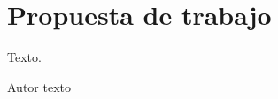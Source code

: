 \chapter{Propuesta de trabajo}
\label{cha:Propuesta de trabajo}

\begin{FraseCelebre}
  \begin{Frase}
    Texto.
  \end{Frase}
  \begin{Fuente}
    Autor texto
  \end{Fuente}
\end{FraseCelebre}

